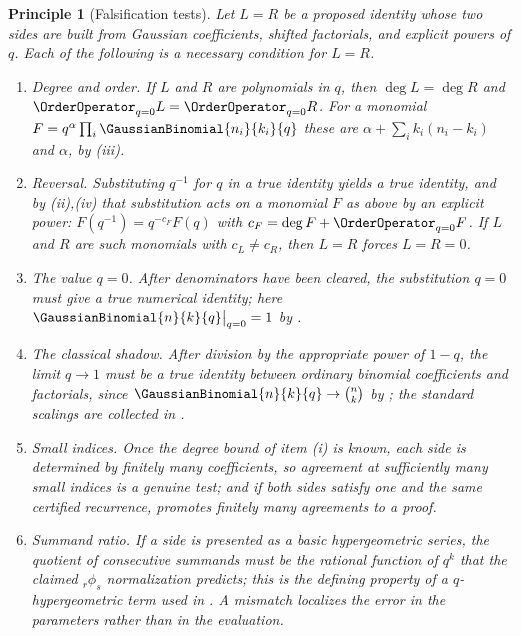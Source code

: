 \documentclass[11pt,a4paper,oneside,openany]{book}
\newtheorem{principle}[principle]{Principle}
\theoremstyle{definition}
\theoremstyle{remark}
\begin{document}
\begin{principle}[Falsification tests]\label{prin:identity-tests}
Let $L=R$ be a proposed identity whose two sides are built from Gaussian
coefficients, shifted factorials, and explicit powers of $q$.  Each of the
following is a necessary condition for $L=R$.
\begin{enumerate}
\item \emph{Degree and order.}  If $L$ and $R$ are polynomials in $q$, then
 $\deg L=\deg R$ and $\OrderOperator_{q=0}L=\OrderOperator_{q=0}R$.  For a monomial
 $F=q^{\alpha}\prod_i\GaussianBinomial{n_i}{k_i}{q}$ these are
 $\alpha+\sum_ik_i(n_i-k_i)$ and $\alpha$, by
 (iii).
\item \emph{Reversal.}  Substituting $q^{-1}$ for $q$ in a true identity
 yields a true identity, and by (ii),(iv) that
 substitution acts on a monomial $F$ as above by an explicit power:
 $F(q^{-1})=q^{-c_F}F(q)$ with
 $c_F=\deg F+\OrderOperator_{q=0}F$.  If $L$ and $R$ are such
 monomials with $c_L\ne c_R$, then $L=R$ forces $L=R=0$.
\item \emph{The value $q=0$.}  After denominators have been cleared, the
 substitution $q=0$ must give a true numerical identity; here
 $\GaussianBinomial{n}{k}{q}\big|_{q=0}=1$ by .
\item \emph{The classical shadow.}  After division by the appropriate power
 of $1-q$, the limit $q\to1$ must be a true identity between ordinary
 binomial coefficients and factorials, since $\GaussianBinomial{n}{k}{q}\to\binom nk$ by
 ; the standard scalings are collected in
 .
\item \emph{Small indices.}  Once the degree bound of item (i) is known, each
 side is determined by finitely many coefficients, so agreement at
 sufficiently many small indices is a genuine test; and if both sides satisfy
 one and the same certified recurrence, 
 promotes finitely many agreements to a proof.
\item \emph{Summand ratio.}  If a side is presented as a basic hypergeometric
 series, the quotient of consecutive summands must be the rational function
 of $q^k$ that the claimed ${}_r\phi_s$ normalization predicts; this is the
 defining property of a $q$-hypergeometric term used in
 .  A mismatch localizes the error in the
 parameters rather than in the evaluation.
\end{enumerate}
\end{principle}
\end{document}
